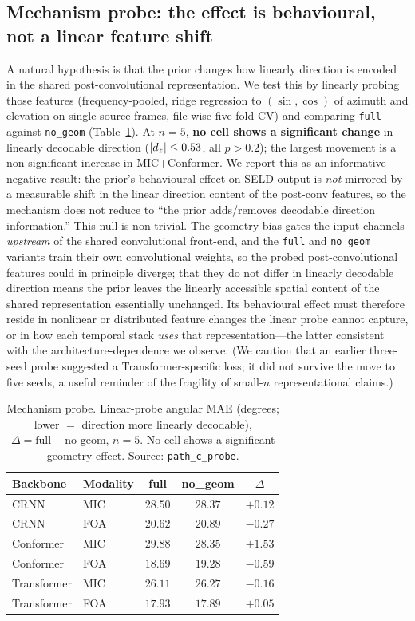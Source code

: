 \subsection{Mechanism probe: the effect is behavioural, not a linear feature shift}
\label{sec:probing}
A natural hypothesis is that the prior changes how linearly direction is encoded
in the shared post-convolutional representation. We test this by linearly probing
those features (frequency-pooled, ridge regression to $(\sin,\cos)$ of azimuth
and elevation on single-source frames, file-wise five-fold CV) and comparing
\texttt{full} against \texttt{no\_geom} (Table~\ref{tab:probe}). At $n=5$,
\textbf{no cell shows a significant change} in linearly decodable direction
($|d_z|\le0.53$, all $p>0.2$); the largest movement is a non-significant increase
in MIC+Conformer. We report this as an informative negative result: the prior's
behavioural effect on SELD output is \emph{not} mirrored by a measurable shift in
the linear direction content of the post-conv features, so the mechanism does not
reduce to ``the prior adds/removes decodable direction information.'' This null is
non-trivial. The geometry bias gates the input channels \emph{upstream} of the
shared convolutional front-end, and the \texttt{full} and \texttt{no\_geom}
variants train their own convolutional weights, so the probed post-convolutional
features could in principle diverge; that they do not differ in linearly decodable
direction means the prior leaves the linearly accessible spatial content of the
shared representation essentially unchanged. Its behavioural effect must therefore
reside in nonlinear or distributed feature changes the linear probe cannot
capture, or in how each temporal stack \emph{uses} that representation---the
latter consistent with the architecture-dependence we observe. (We caution that an earlier three-seed probe suggested a
Transformer-specific loss; it did not survive the move to five seeds, a useful
reminder of the fragility of small-$n$ representational claims.)

\begin{table}[t]
\centering
\caption{Mechanism probe. Linear-probe angular MAE (degrees; lower $=$ direction
more linearly decodable), $\Delta=\text{full}-\text{no\_geom}$, $n=5$. No cell
shows a significant geometry effect. Source: \texttt{path\_c\_probe}.}
\label{tab:probe}
\setlength{\tabcolsep}{4pt}
\begin{tabular}{llccc}
\toprule
Backbone & Modality & full & no\_geom & $\Delta$ \\
\midrule
CRNN        & MIC & $28.50$ & $28.37$ & $+0.12$ \\
CRNN        & FOA & $20.62$ & $20.89$ & $-0.27$ \\
Conformer   & MIC & $29.88$ & $28.35$ & $+1.53$ \\
Conformer   & FOA & $18.69$ & $19.28$ & $-0.59$ \\
Transformer & MIC & $26.11$ & $26.27$ & $-0.16$ \\
Transformer & FOA & $17.93$ & $17.89$ & $+0.05$ \\
\bottomrule
\end{tabular}
\end{table}

